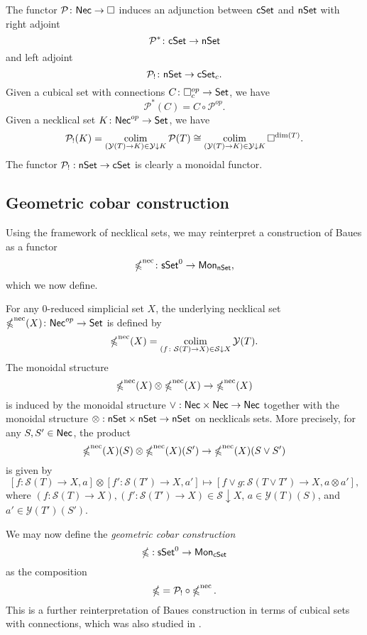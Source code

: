 The functor $\mathcal{P} \colon \mathsf{Nec} \to \square$ induces an adjunction between $\mathsf{cSet}$ and $\mathsf{nSet}$
with right adjoint
$$\mathcal{P}^* \colon \mathsf{cSet} \to \mathsf{nSet}$$
and left adjoint
$$\mathcal{P}_{!}  \colon \mathsf{nSet} \to \mathsf{cSet}_c.$$
Given a cubical set with connections $C \colon \square_c^{op} \to \mathsf{Set}$, we have $$\mathcal{P}^*(C)= C \circ \mathcal{P}^{op}.$$ Given a necklical set $K \colon \mathsf{Nec}^{op} \to \mathsf{Set}$, we have $$\mathcal{P}_{!}(K)= \operatorname*{colim}_{(\mathcal{Y}(T) \to K) \in \mathcal{Y} \downarrow K} \mathcal{P}(T) \cong \operatorname*{colim}_{(\mathcal{Y}(T) \to K) \in \mathcal{Y} \downarrow K} \square^{\text{dim}(T)}.$$ 
The functor $\mathcal{P}_{!}: \mathsf{nSet} \to \mathsf{cSet}$ is clearly a monoidal functor. 

\subsection{Geometric cobar construction}

Using the framework of necklical sets, we may reinterpret a construction of Baues as a functor
$$\operatorname{\mathbb{\Omega}}^{\text{nec}} \colon \mathsf{sSet}^0 \to \mathsf{Mon}_{\mathsf{nSet}},$$ which we now define. 

For any $0$-reduced simplicial set $X$, the underlying necklical set $\operatorname{\mathbb{\Omega}}^{\text{nec}}(X) \colon \mathsf{Nec}^{op} \to \mathsf{Set}$ is defined by
$$\operatorname{\mathbb{\Omega}}^{\text{nec}}(X) = \operatorname*{colim}_{(f \colon \mathcal{S}(T) \to X) \in  \mathcal{S} \downarrow X} \mathcal{Y}(T).$$
The monoidal structure $$\operatorname{\mathbb{\Omega}}^{\text{nec}}(X) \otimes \operatorname{\mathbb{\Omega}}^{\text{nec}}(X) \to \operatorname{\mathbb{\Omega}}^{\text{nec}}(X)$$
is induced by the monoidal structure $\vee: \mathsf{Nec} \times \mathsf{Nec} \to \mathsf{Nec}$ together with the monoidal structure $\otimes: \mathsf{nSet} \times \mathsf{nSet} \to \mathsf{nSet}$ on necklicals sets. More precisely, for any $S, S' \in \mathsf{Nec}$, the product $$\operatorname{\mathbb{\Omega}}^{\text{nec}}(X)(S) \otimes \operatorname{\mathbb{\Omega}}^{\text{nec}}(X)(S') \to \operatorname{\mathbb{\Omega}}^{\text{nec}}(X)(S \vee S')$$ is given by $$[f\colon \mathcal{S}(T) \to X, a] \otimes [f'\colon \mathcal{S}(T') \to X, a'] \mapsto [f \vee g\colon \mathcal{S}(T\vee T') \to X, a \otimes  a'],$$
where $(f\colon \mathcal{S}(T) \to X), (f'\colon \mathcal{S}(T') \to X) \in \mathcal{S} \downarrow X$, $a\in \mathcal{Y}(T)(S)$, and $a'\in \mathcal{Y}(T')(S')$.

We may now define the \textit{geometric cobar construction} $$\operatorname{\mathbb{\Omega}}: \mathsf{sSet}^0 \to \mathsf{Mon}_{\mathsf{cSet}}$$ as the composition $$\operatorname{\mathbb{\Omega}}= \mathcal{P}_! \circ \operatorname{\mathbb{\Omega}}^{\text{nec}}.$$ This is a further reinterpretation of Baues construction in terms of cubical sets with connections, which was also studied in \cite{rivera2018cubical}. 

